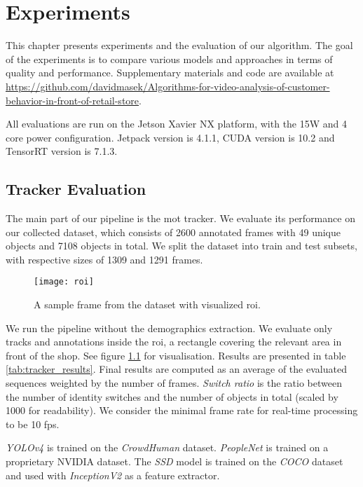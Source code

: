 \chapter{Experiments}\label{ch:experiments}

\begin{sloppypar}
This chapter presents experiments and the evaluation of our algorithm. The goal of the experiments is to compare various models and approaches in terms of quality and performance. Supplementary materials and code are available at \url{https://github.com/davidmasek/Algorithms-for-video-analysis-of-customer-behavior-in-front-of-retail-store}.
\end{sloppypar}

All evaluations are run on the Jetson Xavier NX platform\cite{jetson}, with the 15W and 4 core power configuration. Jetpack version is 4.1.1, CUDA version is 10.2 and TensorRT version is 7.1.3.

\section{Tracker Evaluation}

The main part of our pipeline is the \gls{mot} tracker. We evaluate its performance on our collected dataset, which consists of 2600 annotated frames with 49 unique objects and 7108 objects in total. We split the dataset into train and test subsets, with respective sizes of 1309 and 1291 frames.

\begin{figure}[hbt!]
    \centering
    \texttt{[image: roi]}
    \caption[A sample frame from the dataset with visualized \acrshort{roi}.]{A sample frame from the dataset with visualized \gls{roi}.}
    \label{fig:roi}
\end{figure}

We run the pipeline without the demographics extraction. We evaluate only tracks and annotations inside the \gls{roi}, a rectangle covering the relevant area in front of the shop. See figure \ref{fig:roi} for visualisation. Results are presented in table \ref{tab:tracker_results}. Final results are computed as an average of the evaluated sequences weighted by the number of frames. \textit{Switch ratio} is the ratio between the number of identity switches and the number of objects in total (scaled by 1000 for readability). We consider the minimal frame rate for real-time processing to be 10 \gls{fps}.

\textit{YOLOv4}\cite{bochkovskiy2020yolov4} is trained on the \textit{CrowdHuman}\cite{shao2018crowdhuman} dataset. \textit{PeopleNet}\cite{peoplenet} is trained on a proprietary NVIDIA dataset. The \textit{SSD}\cite{liu2016ssd} model is trained on the \textit{COCO}\cite{lin2014microsoft_coco} dataset and used with \textit{InceptionV2}\cite{ioffe2015batch_inception} as a feature extractor.

